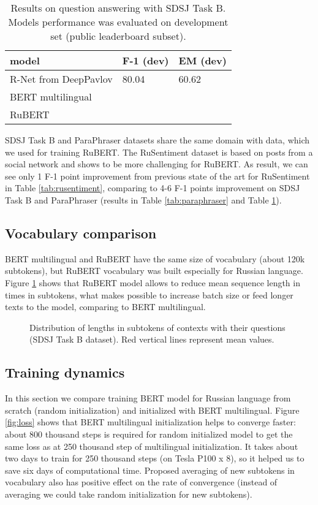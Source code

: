 \documentclass{article}
\begin{document}
\begin{table}[ht!]
\centering
\begin{tabular}{l|l|l}
\hline
model                 & F-1 (dev) & EM (dev) \\ \hline
R-Net from DeepPavlov \cite{burtsev2018deeppavlov} & 80.04     & 60.62    \\ \hline \hline
BERT multilingual     &      &     \\ \hline
RuBERT                &      &     \\ \hline
\end{tabular}
\caption{Results on question answering with SDSJ Task B. Models performance was evaluated on development set (public leaderboard subset).}
\label{tab:squad}
\end{table}

SDSJ Task B and ParaPhraser datasets share the same domain with data, which we used for training RuBERT. The RuSentiment dataset is based on posts from a social network and shows to be more challenging for RuBERT. As result, we can see only 1 F-1 point improvement from previous state of the art for RuSentiment in Table \ref{tab:rusentiment}, comparing to 4-6 F-1 points improvement on SDSJ Task B and ParaPhraser (results in Table \ref{tab:paraphraser} and Table \ref{tab:squad}).

\subsection{Vocabulary comparison}
BERT multilingual and RuBERT have the same size of vocabulary (about 120k subtokens), but RuBERT vocabulary was built especially for Russian language. Figure \ref{fig:vocab_hist} shows that RuBERT model allows to reduce mean sequence length in  times in subtokens, what makes possible to increase batch size or feed longer texts to the model, comparing to BERT multilingual.

\begin{figure}[ht]\centering
    \qquad
    \caption{Distribution of lengths in subtokens of contexts with their questions (SDSJ Task B dataset). Red vertical lines represent mean values.}\label{fig:vocab_hist}\end{figure}

\subsection{Training dynamics}
In this section we compare training BERT model for Russian language from scratch (random initialization) and initialized with BERT multilingual. Figure \ref{fig:loss} shows that BERT multilingual initialization helps to converge faster: about 800 thousand steps is required for random initialized model to get the same loss as at 250 thousand step of multilingual initialization. It takes about two days to train for 250 thousand steps (on Tesla P100 x 8), so it helped us to save six days of computational time. Proposed averaging of new subtokens in vocabulary also has positive effect on the rate of convergence (instead of averaging we could take random initialization for new subtokens).
\end{document}

